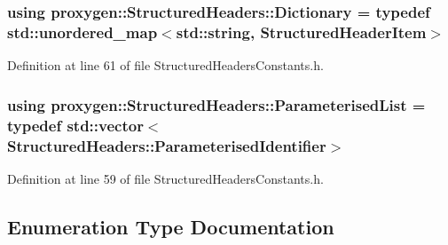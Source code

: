 \subsubsection[{Dictionary}]{\setlength{\rightskip}{0pt plus 5cm}using {\bf proxygen\+::\+Structured\+Headers\+::\+Dictionary} = typedef std\+::unordered\+\_\+map$<$std\+::string, {\bf Structured\+Header\+Item}$>$}\label{namespaceproxygen_1_1StructuredHeaders_ac73b84119fa228ad7c41e18a17a53e24}


Definition at line 61 of file Structured\+Headers\+Constants.\+h.

\subsubsection[{Parameterised\+List}]{\setlength{\rightskip}{0pt plus 5cm}using {\bf proxygen\+::\+Structured\+Headers\+::\+Parameterised\+List} = typedef std\+::vector$<${\bf Structured\+Headers\+::\+Parameterised\+Identifier}$>$}\label{namespaceproxygen_1_1StructuredHeaders_adf3e361bfc9379624beaa5526794aeb5}


Definition at line 59 of file Structured\+Headers\+Constants.\+h.



\subsection{Enumeration Type Documentation}
